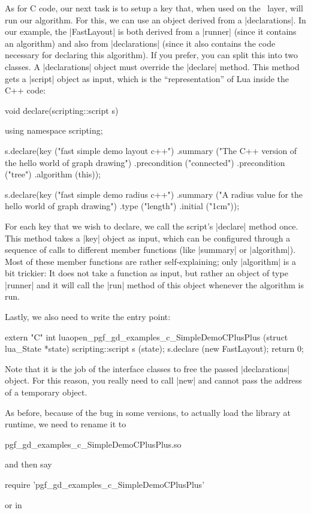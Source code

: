 As for C code, our next task is to setup a key that, when used on the
\tikzname\ layer, will run our algorithm. For this, we can use an object
derived from a |declarations|. In our example, the |FastLayout| is both derived
from a |runner| (since it contains an algorithm) and also from |declarations|
(since it also contains the code necessary for declaring this algorithm). If
you prefer, you can split this into two classes. A |declarations| object must
override the |declare| method. This method gets a |script| object as input,
which is the ``representation'' of Lua inside the C++ code:
%
\begin{codeexample}[code only, tikz syntax=false]
void declare(scripting::script s) {
  using namespace scripting;

  s.declare(key ("fast simple demo layout c++")
            .summary ("The C++ version of the hello world of graph drawing")
            .precondition ("connected")
            .precondition ("tree")
            .algorithm (this));

  s.declare(key ("fast simple demo radius c++")
            .summary ("A radius value for the hello world of graph drawing")
            .type ("length")
            .initial ("1cm"));
}
\end{codeexample}

For each key that we wish to declare, we call the script's |declare| method
once. This method takes a |key| object as input, which can be configured
through a sequence of calls to different member functions (like |summary| or
|algorithm|). Most of these member functions are rather self-explaining; only
|algorithm| is a bit trickier: It does not take a function as input, but rather
an object of type |runner| and it will call the |run| method of this object
whenever the algorithm is run.

Lastly, we also need to write the entry point:
%
\begin{codeexample}[code only, tikz syntax=false]
extern "C" int luaopen_pgf_gd_examples_c_SimpleDemoCPlusPlus (struct lua_State *state) {
  scripting::script s (state);
  s.declare (new FastLayout);
  return 0;
}
\end{codeexample}

Note that it is the job of the interface classes to free the passed
|declarations| object. For this reason, you really need to call |new| and
cannot pass the address of a temporary object.

As before, because of the bug in some  versions, to actually load the
library at runtime, we need to rename it to
%
\begin{codeexample}[code only, tikz syntax=false]
pgf_gd_examples_c_SimpleDemoCPlusPlus.so
\end{codeexample}
%
and then say
%
\begin{codeexample}[code only, tikz syntax=false]
require 'pgf_gd_examples_c_SimpleDemoCPlusPlus'
\end{codeexample}
%
or in \tikzname
%
\begin{codeexample}
\end{codeexample}

